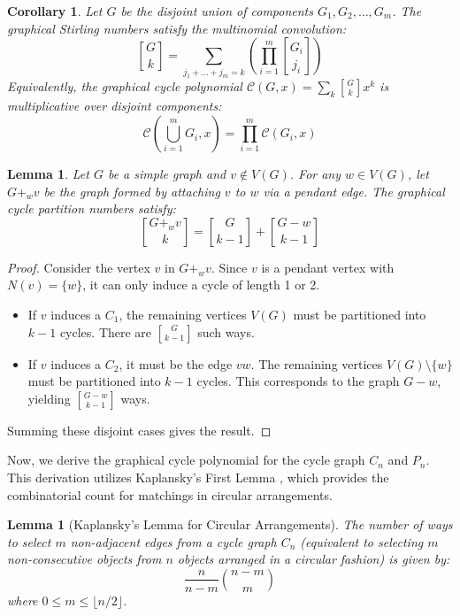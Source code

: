 \documentclass{amsart}
\newcounter{cases}
\newtheorem{lemma}[theorem]{Lemma}
\newtheorem{corollary}[theorem]{Corollary}
\theoremstyle{definition}
\begin{document}
\begin{corollary}\label{thm:chu-vander}
Let $G$ be the disjoint union of components $G_1, G_2, \dots, G_m$. The graphical Stirling numbers satisfy the multinomial convolution:
\begin{equation*}
    {G \brack k} = \sum_{j_1 + \dots + j_m = k} \left( \prod_{i=1}^m {G_i \brack j_i} \right)
\end{equation*}
Equivalently, the graphical cycle polynomial $\mathcal{C}(G, x) = \sum_k {G \brack k} x^k$ is multiplicative over disjoint components:
\begin{equation*}
    \mathcal{C}\left( \bigcup_{i=1}^m G_i, x \right) = \prod_{i=1}^m \mathcal{C}(G_i, x)
\end{equation*}
\end{corollary}


%


\begin{lemma}\label{spike}
Let $G$ be a simple graph and $v \notin V(G)$. For any $w \in V(G)$, let $G+_w v$ be the graph formed by attaching $v$ to $w$ via a pendant edge. The graphical cycle partition numbers satisfy:
\begin{equation*}
    {G+_w v \brack k} = {G \brack k-1} + {G - w \brack k-1}
\end{equation*}
\end{lemma}

\begin{proof}
Consider the vertex $v$ in $G+_w v$. Since $v$ is a pendant vertex with $N(v) = \{w\}$, it can only induce a cycle of length 1 or 2.
\begin{itemize}
    \item If $v$ induces a $C_1$, the remaining vertices $V(G)$ must be partitioned into $k-1$ cycles. There are ${G \brack k-1}$ such ways.
    \item If $v$ induces a $C_2$, it must be the edge $vw$. The remaining vertices $V(G) \setminus \{w\}$ must be partitioned into $k-1$ cycles. This corresponds to the graph $G-w$, yielding ${G - w \brack k-1}$ ways.
\end{itemize}
Summing these disjoint cases gives the result.
\end{proof}
Now, we derive the graphical cycle polynomial for the cycle graph $C_n$ and $P_n$. This derivation utilizes Kaplansky’s First Lemma \cite{God}, which provides the combinatorial count for matchings in circular arrangements.

\begin{lemma}[Kaplansky's Lemma for Circular Arrangements]\label{Kap}
The number of ways to select $m$ non-adjacent edges from a cycle graph $C_n$ (equivalent to selecting $m$ non-consecutive objects from $n$ objects arranged in a circular fashion) is given by:
\begin{equation*}
     \frac{n}{n-m} \binom{n-m}{m}
\end{equation*}
where $0 \leq m \leq \lfloor n/2 \rfloor$.
\end{lemma}
\end{document}
